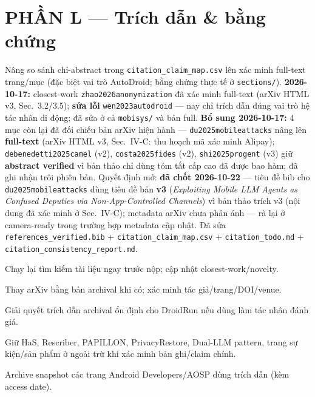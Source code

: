 \documentclass[11pt,a4paper]{article}
\newcommand{\done}{\textcolor{shgreen}{$\blacksquare$}}
\newcommand{\todo}{\textcolor{shgray}{$\square$}}
\newcommand{\code}[1]{\texttt{\small #1}}
\begin{document}
\section*{PHẦN L --- Trích dẫn \& bằng chứng}
\begin{chk}
\item[\done] Nâng so sánh chỉ-abstract trong \code{citation\_claim\_map.csv} lên xác minh full-text trang/mục (đặc biệt vai trò AutoDroid; bằng chứng thực tế ở \code{sections/}). \textbf{2026-10-17:} closest-work \code{zhao2026anonymization} đã xác minh full-text (arXiv HTML v3, Sec.~3.2/3.5); \textbf{sửa lỗi} \code{wen2023autodroid} --- nay chỉ trích dẫn đúng vai trò hệ tác nhân di động; đã sửa ở cả \code{mobisys/} và bản full. \textbf{Bổ sung 2026-10-17:} 4 mục còn lại đã đối chiếu bản arXiv hiện hành --- \code{du2025mobileattacks} nâng lên \textbf{full-text} (arXiv HTML v3, Sec.~IV-C: thu hoạch mã xác minh Alipay); \code{debenedetti2025camel} (v2), \code{costa2025fides} (v2), \code{shi2025progent} (v3) giữ \textbf{abstract verified} vì bản thảo chỉ dùng tóm tắt cấp cao đã được bao hàm; đã ghi nhận trôi phiên bản. Quyết định mở: \textbf{đã chốt 2026-10-22} --- tiêu đề bib cho \code{du2025mobileattacks} dùng tiêu đề bản \textbf{v3} (\emph{Exploiting Mobile LLM Agents as Confused Deputies via Non-App-Controlled Channels}) vì bản thảo trích v3 (nội dung đã xác minh ở Sec.~IV-C); metadata arXiv chưa phản ánh --- rà lại ở camera-ready trong trường hợp metadata cập nhật. Đã sửa \code{references\_verified.bib} + \code{citation\_claim\_map.csv} + \code{citation\_todo.md} + \code{citation\_consistency\_report.md}.
\item[\todo] Chạy lại tìm kiếm tài liệu ngay trước nộp; cập nhật closest-work/novelty.
\item[\todo] Thay arXiv bằng bản archival khi có; xác minh tác giả/trang/DOI/venue.
\item[\todo] Giải quyết trích dẫn archival ổn định cho DroidRun nếu dùng làm tác nhân đánh giá.
\item[\todo] Giữ HaS, Rescriber, PAPILLON, PrivacyRestore, Dual-LLM pattern, trang sự kiện/sản phẩm ở ngoài trừ khi xác minh bản ghi/claim chính.
\item[\todo] Archive snapshot các trang Android Developers/AOSP dùng trích dẫn (kèm access date).
\end{chk}
\end{document}

